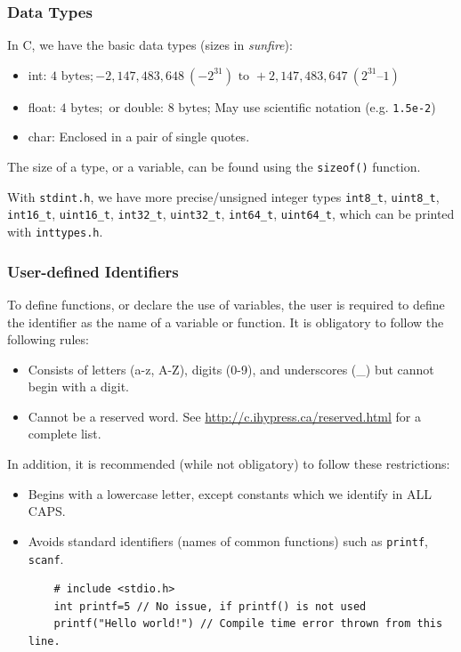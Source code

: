 \subsubsection{Data Types}
In C, we have the basic data types (sizes in \textit{sunfire}):
\begin{itemize}
  \item int: $4\text{ bytes}; -2,147,483,648\ (-2^{31})\text{ to }+2,147,483,647\ (2^{31} – 1)$
  \item float: $4\text{ bytes};$ or double: $8\text{ bytes}$; May use
  scientific notation (e.g. \verb|1.5e-2|)
  \item char: Enclosed in a pair of single quotes.
\end{itemize}
The size of a type, or a variable, can be found using the \verb|sizeof()| function.\\
\begin{remark}
  With \verb|stdint.h|, we have more precise/unsigned integer types
  \verb|int8_t|, \verb|uint8_t|, \verb|int16_t|, \verb|uint16_t|,
  \verb|int32_t|, \verb|uint32_t|, \verb|int64_t|, \verb|uint64_t|, which can
  be printed with \verb|inttypes.h|.
\end{remark}
\subsubsection{User-defined Identifiers}
To define functions, or declare the use of variables, the user is required to
define the identifier as the name of a variable or function. It is obligatory
to follow the following rules:
\begin{itemize}
  \item Consists of letters (a-z, A-Z), digits (0-9), and underscores (\_)
    but cannot begin with a digit.
  \item Cannot be a reserved word. See \url{http://c.ihypress.ca/reserved.html}
    for a complete list.
\end{itemize}
In addition, it is recommended (while not obligatory) to follow these restrictions:
\begin{itemize}
  \item Begins with a lowercase letter, except constants which we identify in ALL CAPS.
  \item Avoids standard identifiers (names of common functions) such as
  \verb|printf|, \verb|scanf|.
  \begin{lstlisting}
    # include <stdio.h>
    int printf=5 // No issue, if printf() is not used
    printf("Hello world!") // Compile time error thrown from this line.
  \end{lstlisting}
\end{itemize}
